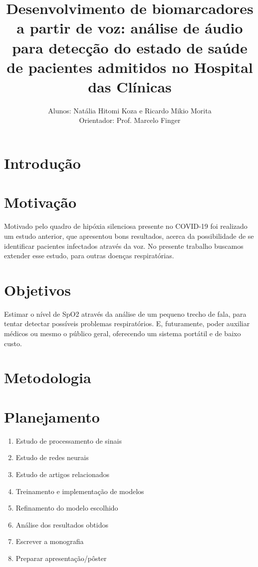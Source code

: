 \documentclass[12pt, a4paper]{article}
\begin{document}
\title{Desenvolvimento de biomarcadores a partir de voz: análise de áudio para detecção do estado de saúde de pacientes admitidos no Hospital das Clínicas}

\author{Alunos: Natália Hitomi Koza e Ricardo Mikio Morita \\ Orientador: Prof. Marcelo Finger}
\maketitle

\section{Introdução}

\section{Motivação}

Motivado pelo quadro de hipóxia silenciosa presente no COVID-19 foi realizado um estudo anterior, que apresentou bons resultados, acerca da possibilidade de se identificar pacientes infectados através da voz. No presente trabalho buscamos extender esse estudo, para outras doenças respiratórias.


\section{Objetivos}

Estimar o nível de SpO2 através da análise de um pequeno trecho de fala, para tentar detectar possíveis problemas respiratórios. E, futuramente, poder auxiliar médicos ou mesmo o público geral, oferecendo um sistema portátil e de baixo custo.

\section{Metodologia}

\section{Planejamento}

\begin{enumerate}
    \item Estudo de processamento de sinais
    \item Estudo de redes neurais
    \item Estudo de artigos relacionados
    \item Treinamento e implementação de modelos
    \item Refinamento do modelo escolhido
    \item Análise dos resultados obtidos
    \item Escrever a monografia
    \item Preparar apresentação/pôster
\end{enumerate}
\end{document}
